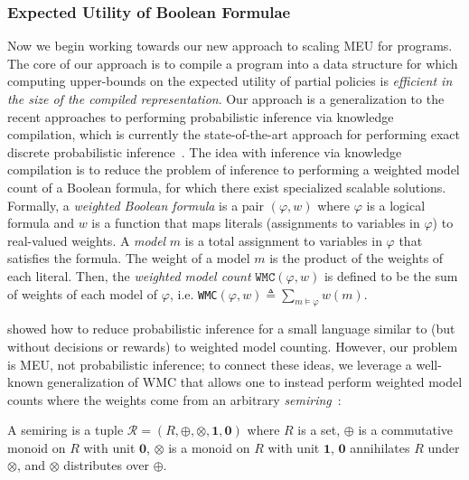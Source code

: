 \subsubsection{Expected Utility of Boolean Formulae}\label{subsubsec:eu-via-compilation}
Now we begin working towards our new approach to scaling MEU for \dappl{}
programs. The core of our approach is to compile a \dappl{} program into a data
structure for which computing upper-bounds on the expected utility of partial
policies is \emph{efficient in the size of the compiled representation}.  Our
approach is a generalization to the recent approaches to performing
probabilistic inference via knowledge compilation, which is currently the
state-of-the-art approach for performing exact discrete probabilistic
inference~\citep{holtzen2020scaling,fierens2015inference}.  The idea with
inference via knowledge compilation is to reduce the problem of inference to
performing a weighted model count of a Boolean formula, for which there exist
specialized scalable solutions. Formally, a \emph{weighted Boolean formula} is a
pair $(\varphi, w)$ where $\varphi$ is a logical formula and $w$ is a function
that maps literals (assignments to variables in $\varphi$) to real-valued
weights.  A \emph{model} $m$ is a total  assignment to variables in $\varphi$
that satisfies the formula.  The weight of a model $m$ is the product of the
weights of each literal.  Then, the \emph{weighted model count}
$\texttt{WMC}(\varphi, w)$ is defined to be the sum of weights of each model of
$\varphi$, i.e. \texttt{WMC}$(\varphi, w) \triangleq \sum_{m \models \varphi} w(m)$.

\citet{holtzen2020scaling} showed how to reduce probabilistic inference for a
small language similar to \dappl{} (but without decisions or rewards) to weighted model counting. However,
our problem is MEU, not probabilistic inference; to connect these ideas,
we leverage a well-known generalization of WMC that allows one to instead
perform weighted model counts where the weights come from an
arbitrary \emph{semiring}~\citep{kimmig2017algebraic,kimmig2011algebraic}:

\begin{definition}[Semiring]\label{def:semiring}
  A semiring is a tuple $\mathcal R = (R, \oplus, \otimes, \mathbf{1}, \mathbf{0})$
  where $R$ is a set, $\oplus$ is a commutative monoid on $R$ with
  unit $\mathbf{0}$, $\otimes$ is a monoid on $R$ with unit $\mathbf{1}$,
  $\mathbf{0}$ annihilates $R$ under $\otimes$, and $\otimes$ distributes over $\oplus$.
\end{definition}


